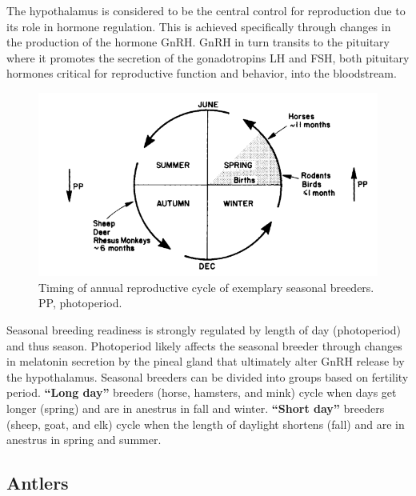 \documentclass[]{book}
\begin{document}
The hypothalamus is considered to be the central control for
reproduction due to its role in hormone regulation. This is achieved
specifically through changes in the production of the hormone GnRH. GnRH
in turn transits to the pituitary where it promotes the secretion of the
gonadotropins LH and FSH, both pituitary hormones critical for
reproductive function and behavior, into the bloodstream.

\begin{figure}

{\centering \includegraphics[width=0.7\linewidth]{figures/seasonal-breed} 

}

\caption{Timing of annual reproductive cycle of exemplary seasonal breeders. PP, photoperiod. }\label{fig:seaonal-breed}
\end{figure}

Seasonal breeding readiness is strongly regulated by length of day
(photoperiod) and thus season. Photoperiod likely affects the seasonal
breeder through changes in melatonin secretion by the pineal gland that
ultimately alter GnRH release by the hypothalamus. Seasonal breeders can
be divided into groups based on fertility period. \textbf{``Long day''}
breeders (horse, hamsters, and mink) cycle when days get longer (spring)
and are in anestrus in fall and winter. \textbf{``Short day''} breeders
(sheep, goat, and elk) cycle when the length of daylight shortens (fall)
and are in anestrus in spring and summer.

\subsection{Antlers}\label{antlers}
\end{document}

